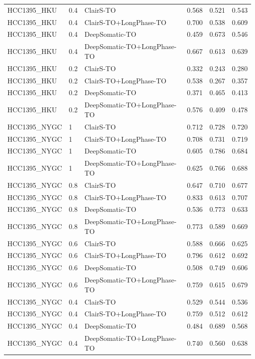 \documentclass[pdflatex,sn-nature]{sn-jnl}
\begin{document}
{\begin{longtable}{@{}lllccc@{}}
  HCC1395\_HKU & 0.4 & ClairS-TO & 0.568 & 0.521 & 0.543 \\
  HCC1395\_HKU & 0.4 & ClairS-TO+LongPhase-TO & 0.700 & 0.538 & 0.609 \\
  HCC1395\_HKU & 0.4 & DeepSomatic-TO & 0.459 & 0.673 & 0.546 \\
  HCC1395\_HKU & 0.4 & DeepSomatic-TO+LongPhase-TO & 0.667 & 0.613 & 0.639 \\
  HCC1395\_HKU & 0.2 & ClairS-TO & 0.332 & 0.243 & 0.280 \\
  HCC1395\_HKU & 0.2 & ClairS-TO+LongPhase-TO & 0.538 & 0.267 & 0.357 \\
  HCC1395\_HKU & 0.2 & DeepSomatic-TO & 0.371 & 0.465 & 0.413 \\
  HCC1395\_HKU & 0.2 & DeepSomatic-TO+LongPhase-TO & 0.576 & 0.409 & 0.478 \\
  HCC1395\_NYGC & 1 & ClairS-TO & 0.712 & 0.728 & 0.720 \\
  HCC1395\_NYGC & 1 & ClairS-TO+LongPhase-TO & 0.708 & 0.731 & 0.719 \\
  HCC1395\_NYGC & 1 & DeepSomatic-TO & 0.605 & 0.786 & 0.684 \\
  HCC1395\_NYGC & 1 & DeepSomatic-TO+LongPhase-TO & 0.625 & 0.766 & 0.688 \\
  HCC1395\_NYGC & 0.8 & ClairS-TO & 0.647 & 0.710 & 0.677 \\
  HCC1395\_NYGC & 0.8 & ClairS-TO+LongPhase-TO & 0.833 & 0.613 & 0.707 \\
  HCC1395\_NYGC & 0.8 & DeepSomatic-TO & 0.536 & 0.773 & 0.633 \\
  HCC1395\_NYGC & 0.8 & DeepSomatic-TO+LongPhase-TO & 0.773 & 0.589 & 0.669 \\
  HCC1395\_NYGC & 0.6 & ClairS-TO & 0.588 & 0.666 & 0.625 \\
  HCC1395\_NYGC & 0.6 & ClairS-TO+LongPhase-TO & 0.796 & 0.612 & 0.692 \\
  HCC1395\_NYGC & 0.6 & DeepSomatic-TO & 0.508 & 0.749 & 0.606 \\
  HCC1395\_NYGC & 0.6 & DeepSomatic-TO+LongPhase-TO & 0.759 & 0.615 & 0.679 \\
  HCC1395\_NYGC & 0.4 & ClairS-TO & 0.529 & 0.544 & 0.536 \\
  HCC1395\_NYGC & 0.4 & ClairS-TO+LongPhase-TO & 0.759 & 0.512 & 0.612 \\
  HCC1395\_NYGC & 0.4 & DeepSomatic-TO & 0.484 & 0.689 & 0.568 \\
  HCC1395\_NYGC & 0.4 & DeepSomatic-TO+LongPhase-TO & 0.740 & 0.560 & 0.638 \\

\end{longtable}}
\end{document}

